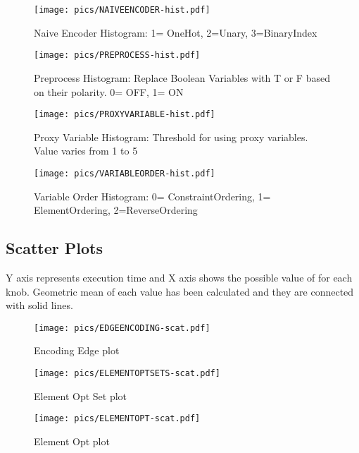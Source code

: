 \begin{figure}[htb]
	\centering
	\texttt{[image: pics/NAIVEENCODER-hist.pdf]}
	\caption{Naive Encoder Histogram: 1= OneHot, 2=Unary, 3=BinaryIndex}
	\label{fig:naiveencoder}
\end{figure}

\begin{figure}[htb]
	\centering
	\texttt{[image: pics/PREPROCESS-hist.pdf]}
	\caption{Preprocess Histogram: Replace Boolean Variables with T or F based on their polarity. 0= OFF, 1= ON}
	\label{fig:preprocess}
\end{figure}

\begin{figure}[htb]
	\centering
	\texttt{[image: pics/PROXYVARIABLE-hist.pdf]}
	\caption{Proxy Variable Histogram: Threshold for using proxy variables. Value varies from 1 to 5}
	\label{fig:proxyvariable}
\end{figure}

\begin{figure}[htb]
	\centering
	\texttt{[image: pics/VARIABLEORDER-hist.pdf]}
	\caption{Variable Order Histogram: 0= ConstraintOrdering, 1= ElementOrdering, 2=ReverseOrdering}
	\label{fig:variableorder}
\end{figure}

\clearpage
\subsection{Scatter Plots}\label{subsec:scatter}

Y axis represents execution time and X axis shows the possible value of for each knob.
Geometric mean of each value has been calculated and they are connected with solid lines.

\begin{figure}[htb]
	\centering
	\texttt{[image: pics/EDGEENCODING-scat.pdf]}
	\caption{Encoding Edge plot}
	\label{fig:edgeencodings}
\end{figure}


\begin{figure}[htb]
	\centering
	\texttt{[image: pics/ELEMENTOPTSETS-scat.pdf]}
	\caption{Element Opt Set plot}
	\label{fig:elementoptsets}
\end{figure}

\begin{figure}[htb]
	\centering
	\texttt{[image: pics/ELEMENTOPT-scat.pdf]}
	\caption{Element Opt plot}
	\label{fig:elementopts}
\end{figure}

